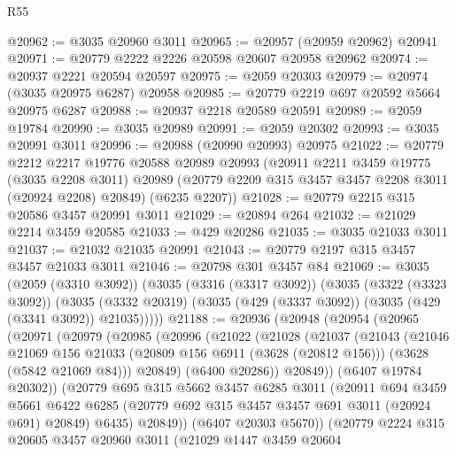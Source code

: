 \begin{lexlean}{R55}
\begin{coremodule}
@20962 := @3035 @20960 @3011
@20965 := @20957 (@20959 @20962) @20941
@20971 := @20779 @2222 @2226 @20598 @20607 @20958 @20962
@20974 := @20937 @2221 @20594 @20597
@20975 := @2059 @20303
@20979 := @20974 (@3035 @20975 @6287) @20958
@20985 := @20779 @2219 @697 @20592 @5664 @20975 @6287
@20988 := @20937 @2218 @20589 @20591
@20989 := @2059 @19784
@20990 := @3035 @20989
@20991 := @2059 @20302
@20993 := @3035 @20991 @3011
@20996 := @20988 (@20990 @20993) @20975
@21022 := @20779
    @2212
    @2217
    @19776
    @20588
    @20989
    @20993
    (@20911
      @2211
      @3459
      @19775
      (@3035 @2208 @3011)
      @20989
      (@20779 @2209 @315 @3457 @3457 @2208 @3011 (@20924 @2208) @20849)
      (@6235 @2207))
@21028 := @20779 @2215 @315 @20586 @3457 @20991 @3011
@21029 := @20894 @264
@21032 := @21029 @2214 @3459 @20585
@21033 := @429 @20286
@21035 := @3035 @21033 @3011
@21037 := @21032 @21035 @20991
@21043 := @20779 @2197 @315 @3457 @3457 @21033 @3011
@21046 := @20798 @301 @3457 @84
@21069 := @3035
    (@2059 (@3310 @3092))
    (@3035
      (@3316 (@3317 @3092))
      (@3035
        (@3322 (@3323 @3092))
        (@3035 (@3332 @20319) (@3035 (@429 (@3337 @3092)) (@3035 (@429 (@3341 @3092)) @21035)))))
@21188 := @20936
    (@20948
      (@20954
        (@20965
          (@20971
            (@20979
              (@20985
                (@20996
                  (@21022
                    (@21028
                      (@21037
                        (@21043
                          (@21046
                            @21069
                            @156
                            @21033
                            (@20809 @156 @6911 (@3628 (@20812 @156)))
                            (@3628 (@5842 @21069 @84)))
                          @20849)
                        (@6400 @20286))
                      @20849))
                  (@6407 @19784 @20302))
                (@20779
                  @695
                  @315
                  @5662
                  @3457
                  @6285
                  @3011
                  (@20911
                    @694
                    @3459
                    @5661
                    @6422
                    @6285
                    (@20779 @692 @315 @3457 @3457 @691 @3011 (@20924 @691) @20849)
                    @6435)
                  @20849))
              (@6407 @20303 @5670))
            (@20779
              @2224
              @315
              @20605
              @3457
              @20960
              @3011
              (@21029
                @1447
                @3459
                @20604

\end{coremodule}
\end{lexlean}
